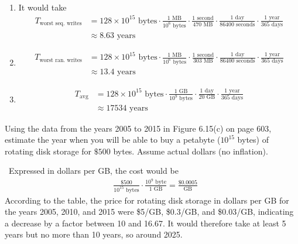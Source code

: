 \documentclass[12pt]{article}
\newenvironment{ex}[2][Exercise]{\begin{trivlist}
		\item[\hskip \labelsep {\bfseries #1}\hskip \labelsep {\bfseries #2.}]}{\end{trivlist}}
\newenvironment{sol}[1][Solution]{\begin{trivlist}
		\item[\hskip \labelsep {\bfseries #1:}]}{\end{trivlist}}
\begin{document}
\begin{sol}
	\
	\begin{enumerate}[label=(\alph*)]
		\item It would take
		\begin{align*}
			T_{\text{worst seq. writes}}&=
			128\times 10^{15}\text{ bytes}
			\cdot \frac{1 \text{ MB}}{10^6 \text{ bytes}}
			\cdot \frac{1 \text{ second}}{470 \text{ MB}}
			\cdot \frac{1 \text{ day}}{86400 \text{ seconds}}
			\cdot \frac{1 \text{ year}}{365 \text{ days}}\\
			&\approx 8.63 \text{ years}
		\end{align*}
		\item 
		\begin{align*}
			T_{\text{worst ran. writes}}&=
			128\times 10^{15}\text{ bytes}
			\cdot \frac{1 \text{ MB}}{10^6 \text{ bytes}}
			\cdot \frac{1 \text{ second}}{303 \text{ MB}}
			\cdot \frac{1 \text{ day}}{86400 \text{ seconds}}
			\cdot \frac{1 \text{ year}}{365 \text{ days}}\\
			&\approx 13.4 \text{ years}
		\end{align*}
		\item 
		\begin{align*}
			T_{\text{avg}}&=
			128\times 10^{15}\text{ bytes}
			\cdot \frac{1 \text{ GB}}{10^9 \text{ bytes}}
			\cdot \frac{1 \text{ day}}{20 \text{ GB}}
			\cdot \frac{1 \text{ year}}{365 \text{ days}}\\
			&\approx 17534 \text{ years}
		\end{align*}
	\end{enumerate}
\end{sol}

\begin{ex}{6.6}
	Using the data from the years 2005 to 2015 in Figure 6.15(c) on page 603, estimate the
	year when you will be able to buy a petabyte ($10^{15}$ bytes) of rotating disk storage
	for $\$500$ bytes. Assume actual dollars (no inflation).
\end{ex}

\begin{sol}
	\
	Expressed in dollars per GB, the cost would be
	\begin{align*}
		&\frac{\$500}{10^{15}\text{ bytes}}
		\cdot \frac{10^{9} \text{ byte}}{1 \text{ GB}}
		=\frac{\$0.0005}{\text{GB}}
	\end{align*}
	According to the table, the price for rotating disk storage in dollars per GB
	for the years 2005, 2010, and 2015 were \$5/GB, \$0.3/GB, and \$0.03/GB,
	indicating a decrease by a factor between 10 and 16.67. It would therefore
	take at least 5 years but no more than 10 years, so around 2025.
\end{sol}
\end{document}
